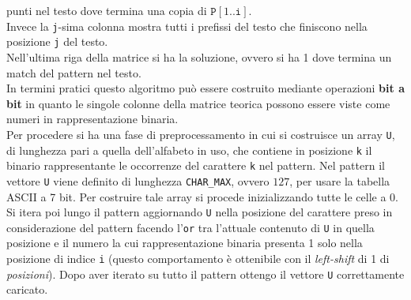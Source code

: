 \documentclass[a4paper,12pt, oneside]{article}
\begin{document}
punti nel testo dove termina una copia di
$\mathtt{P}[1..\mathtt{i}]$.\\
Invece la \texttt{j}-sima colonna mostra tutti i prefissi del testo
che finiscono nella posizione \texttt{j} del testo.\\
Nell'ultima riga della matrice si ha la soluzione, ovvero si ha 1 dove
termina un match del pattern nel testo.\\
In termini pratici questo algoritmo può essere costruito mediante
operazioni \textbf{bit a bit} in quanto le singole colonne della
matrice teorica possono essere viste come numeri in rappresentazione
binaria.\\
Per procedere si ha una fase di preprocessamento in cui si costruisce
un array \texttt{U}, di lunghezza pari a quella dell'alfabeto in uso,
che contiene in posizione \texttt{k} il binario rappresentante le
occorrenze del carattere \texttt{k} nel pattern. Nel pattern il
vettore \texttt{U} viene definito di lunghezza \texttt{CHAR\_MAX},
ovvero $127$, per usare la tabella ASCII a 7 bit. Per costruire tale
array si procede inizializzando tutte le celle a 0. Si itera poi lungo
il pattern aggiornando \texttt{U} nella posizione del carattere preso
in considerazione del pattern facendo l'\texttt{or} tra l'attuale
contenuto di \texttt{U} in quella posizione e il numero la cui
rappresentazione binaria presenta 1 solo nella posizione di indice
\texttt{i} (questo comportamento è ottenibile con il
\textit{left-shift} di 1 di \textit{posizioni}). Dopo aver iterato su
tutto il pattern ottengo il vettore \texttt{U} correttamente caricato.
\end{document}
